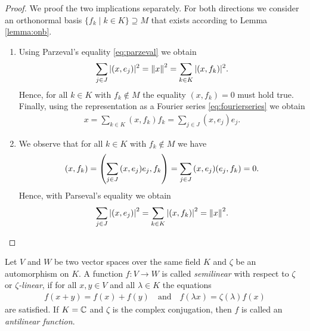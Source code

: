 \begin{proof}
	We proof the two implications separately. For both directions we consider an orthonormal basis $\{f_k \mid k \in K\} \supseteq M$ that exists according to Lemma \ref{lemma:onb}. 
	\begin{enumerate}
		\item[\Quote{$\Rightarrow$}]  Using Parzeval's equality \eqref{eq:parzeval} we obtain
		\begin{align*}
			\sum_{j \in J} |(x, e_j)|^2 = \norm[]{x}^2 = \sum_{k \in K} |(x,f_k)|^2.
		\end{align*}
		Hence,  for all $k \in K$ with $f_k \notin M$ the equality $(x, f_k) = 0$ must hold true. Finally, using the representation as a Fourier series \eqref{eq:fourierseries} we obtain
		\begin{align*}
			x = \sum_{k \in K} (x,f_k) f_k = \sum_{j \in J} (x,e_j) e_j.
		\end{align*}
		
		\item[\Quote{$\Leftarrow$}] We observe that for all $k \in K$ with $f_k \notin M$ we have 
		\begin{align*}
			\pbraces{x, f_k} = \pbraces{\sum_{j \in J} \pbraces{x, e_j} e_j, f_k} = \sum_{j \in J} \pbraces{x, e_j} \pbraces{e_j, f_k} = 0.
		\end{align*}
		Hence, with Parseval's equality we obtain
		\begin{align*}
			\sum_{j \in J} \vbraces{\pbraces{x,e_j}}^2 = \sum_{k \in K} \vbraces{\pbraces{x,f_k}}^2 = \norm[]{x}^2.
		\end{align*}
	\end{enumerate}
	
\end{proof}



\begin{definition}
	Let $V$ and $W$ be two vector spaces over the same field $K$ and $\zeta$ be an automorphism on $K$. A function $f: V \to W$ is called \textit{semilinear} with respect to $\zeta$ or $\zeta$\textit{-linear}, if for all $x,y \in V$ and all $\lambda \in K$ the equations
	\begin{align*}
		f(x + y) = f(x) + f(y) \quad \text{and} \quad f(\lambda x) = \zeta(\lambda) f(x)
	\end{align*}
	are satisfied. If $K = \C$ and $\zeta$ is the complex conjugation, then $f$ is called an \textit{antilinear function}.
\end{definition}


